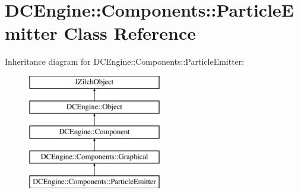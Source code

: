 \hypertarget{classDCEngine_1_1Components_1_1ParticleEmitter}{\section{D\-C\-Engine\-:\-:Components\-:\-:Particle\-Emitter Class Reference}
\label{classDCEngine_1_1Components_1_1ParticleEmitter}
}
Inheritance diagram for D\-C\-Engine\-:\-:Components\-:\-:Particle\-Emitter\-:\begin{figure}[H]
\begin{center}
\leavevmode
\includegraphics[height=5.000000cm]{classDCEngine_1_1Components_1_1ParticleEmitter}
\end{center}
\end{figure}
